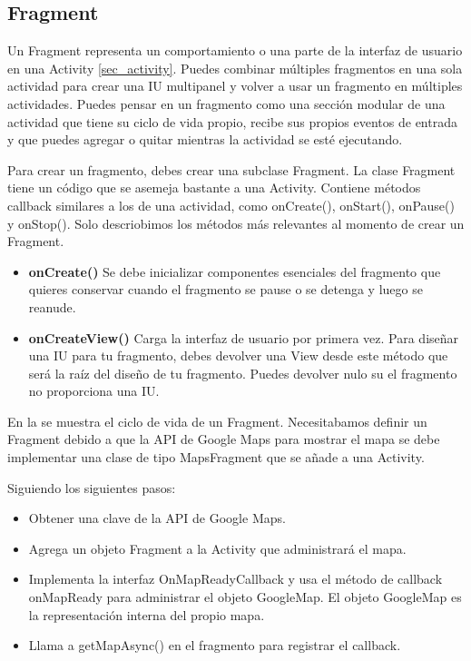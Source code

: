\subsection{Fragment}
\noindent
Un Fragment representa un comportamiento o una parte de la interfaz de usuario en una Activity \ref{sec_activity}. Puedes combinar múltiples fragmentos en una sola actividad para crear una IU multipanel y volver a usar un fragmento en múltiples actividades. Puedes pensar en un fragmento como una sección modular de una actividad que tiene su ciclo de vida propio, recibe sus propios eventos de entrada y que puedes agregar o quitar mientras la actividad se esté ejecutando.

\noindent
Para crear un fragmento, debes crear una subclase Fragment. La clase Fragment tiene un código que se asemeja bastante a una Activity. Contiene métodos callback similares a los de una actividad, como onCreate(), onStart(), onPause() y onStop(). Solo descriobimos los métodos más relevantes al momento de crear un Fragment.

\begin{itemize}
	\item \textbf{onCreate()} Se debe inicializar componentes esenciales del fragmento que quieres conservar cuando el fragmento se pause o se detenga y luego se reanude.
	\item \textbf{onCreateView()} Carga la interfaz de usuario por primera vez. Para diseñar una IU para tu fragmento, debes devolver una View desde este método que será la raíz del diseño de tu fragmento. Puedes devolver nulo su el fragmento no proporciona una IU.
\end{itemize}

\noindent
En la  se muestra el ciclo de vida de un Fragment. Necesitabamos definir un Fragment debido a que la API de Google Maps para mostrar el mapa se debe implementar una clase de tipo MapsFragment que se añade a una Activity.


\noindent
Siguiendo los siguientes pasos:
\begin{itemize}
	\item Obtener una clave de la API de Google Maps.
 	\item Agrega un objeto Fragment a la Activity que administrará el mapa. 
    \item Implementa la interfaz OnMapReadyCallback y usa el método de callback onMapReady para administrar el objeto GoogleMap. El objeto GoogleMap es la representación interna del propio mapa.
    \item Llama a getMapAsync() en el fragmento para registrar el callback.
\end{itemize}

